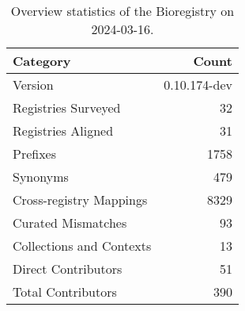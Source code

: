 \begin{table}
\caption{Overview statistics of the Bioregistry on 2024-03-16.}
\label{tab:bioregistry-summary}
\begin{tabular}{lr}
\toprule
Category & Count \\
\midrule
Version & 0.10.174-dev \\
Registries Surveyed & 32 \\
Registries Aligned & 31 \\
Prefixes & 1758 \\
Synonyms & 479 \\
Cross-registry Mappings & 8329 \\
Curated Mismatches & 93 \\
Collections and Contexts & 13 \\
Direct Contributors & 51 \\
Total Contributors & 390 \\
\bottomrule
\end{tabular}
\end{table}
